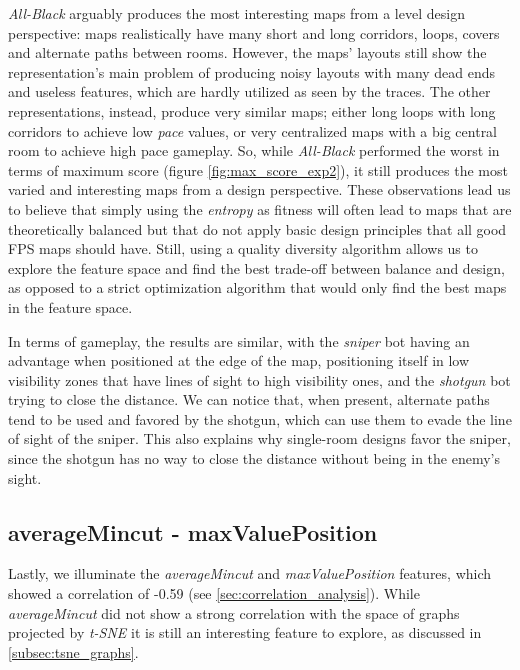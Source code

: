 \textit{All-Black} arguably produces the most interesting maps from a level design perspective: maps realistically have many short and long corridors, loops, covers and alternate paths between rooms. However, the maps' layouts still show the representation's main problem of producing noisy layouts with many dead ends and useless features, which are hardly utilized as seen by the traces. The other representations, instead, produce very similar maps; either long loops with long corridors to achieve low \textit{pace} values, or very centralized maps with a big central room to achieve high pace gameplay. So, while \textit{All-Black} performed the worst in terms of maximum score (figure \ref{fig:max_score_exp2}), it still produces the most varied and interesting maps from a design perspective. These observations lead us to believe that simply using the \textit{entropy} as fitness will often lead to maps that are theoretically balanced but that do not apply basic design principles that all good FPS maps should have. Still, using a quality diversity algorithm allows us to explore the feature space and find the best trade-off between balance and design, as opposed to a strict optimization algorithm that would only find the best maps in the feature space. 

In terms of gameplay, the results are similar, with the \textit{sniper} bot having an advantage when positioned at the edge of the map, positioning itself in low visibility zones that have lines of sight to high visibility ones, and the \textit{shotgun} bot trying to close the distance. We can notice that, when present, alternate paths tend to be used and favored by the shotgun, which can use them to evade the line of sight of the sniper. This also explains why single-room designs favor the sniper, since the shotgun has no way to close the distance without being in the enemy's sight.

\clearpage

\subsection{averageMincut - maxValuePosition}
Lastly, we illuminate the \textit{averageMincut} and \textit{maxValuePosition} features, which showed a correlation of -0.59 (see \cref{sec:correlation_analysis}). While \textit{averageMincut} did not show a strong correlation with the space of graphs projected by \textit{t-SNE} it is still an interesting feature to explore, as discussed in \cref{subsec:tsne_graphs}. 

